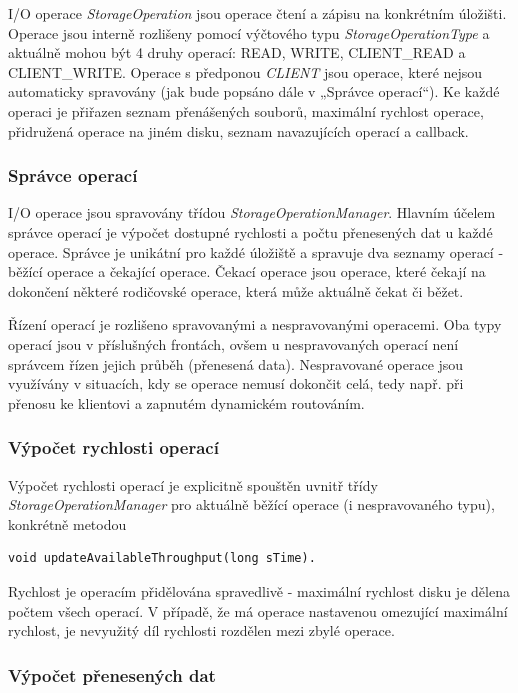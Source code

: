 \documentclass[czech,DP]{thesiskiv}
\begin{document}
I/O operace \textit{StorageOperation} jsou operace čtení a zápisu na konkrétním úložišti. Operace jsou interně rozlišeny pomocí výčtového typu \textit{StorageOperationType} a aktuálně mohou být 4 druhy operací: READ, WRITE, CLIENT\_READ a CLIENT\_WRITE. Operace s předponou \textit{CLIENT} jsou operace, které nejsou automaticky spravovány (jak bude popsáno dále v „Správce operací“). Ke každé operaci je přiřazen seznam přenášených souborů, maximální rychlost operace, přidružená operace na jiném disku, seznam navazujících operací a callback.

\subsubsection*{Správce operací}

I/O operace jsou spravovány třídou \textit{StorageOperationManager}. Hlavním účelem správce operací je výpočet dostupné rychlosti a počtu přenesených dat u každé operace. Správce je unikátní pro každé úložiště a spravuje dva seznamy operací - běžící operace a čekající operace. Čekací operace jsou operace, které čekají na dokončení některé rodičovské operace, která může aktuálně čekat či běžet.

Řízení operací je rozlišeno spravovanými a nespravovanými operacemi. Oba typy operací jsou v příslušných frontách, ovšem u nespravovaných operací není správcem řízen jejich průběh (přenesená data). Nespravované operace jsou využívány v situacích, kdy se operace nemusí dokončit celá, tedy např. při přenosu ke klientovi a zapnutém dynamickém routováním.

\subsubsection*{Výpočet rychlosti operací}

Výpočet rychlosti operací je explicitně spouštěn uvnitř třídy \textit{StorageOperationManager} pro aktuálně běžící operace (i nespravovaného typu), konkrétně metodou

\begin{verbatim}
void updateAvailableThroughput(long sTime).
\end{verbatim}
Rychlost je operacím přidělována spravedlivě - maximální rychlost disku je dělena počtem všech operací. V případě, že má operace nastavenou omezující maximální rychlost, je nevyužitý díl rychlosti rozdělen mezi zbylé operace. 

\subsubsection*{Výpočet přenesených dat}
\end{document}
